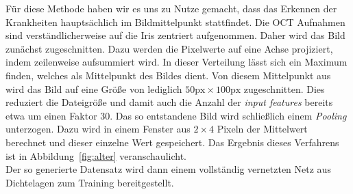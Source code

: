 %
Für diese Methode haben wir es uns zu Nutze gemacht, dass das Erkennen der
Krankheiten hauptsächlich im Bildmittelpunkt stattfindet. Die OCT Aufnahmen
sind verständlicherweise auf die Iris zentriert aufgenommen.
Daher wird das Bild zunächst zugeschnitten. Dazu werden die Pixelwerte auf eine
Achse projiziert, indem zeilenweise aufsummiert wird. In dieser Verteilung
lässt sich ein Maximum finden, welches als Mittelpunkt des Bildes dient.
Von diesem Mittelpunkt aus wird das Bild auf eine Größe von lediglich
$50\text{px}\times100\text{px}$ zugeschnitten. Dies reduziert die Dateigröße
und damit auch die Anzahl der \textit{input features} bereits etwa um einen
Faktor $30$.
Das so entstandene Bild wird schließlich einem \textit{Pooling} unterzogen.
Dazu wird in einem Fenster aus $2\times4$ Pixeln der Mittelwert berechnet und
dieser einzelne Wert gespeichert. Das Ergebnis dieses Verfahrens ist in
Abbildung~\ref{fig:alter} veranschaulicht. \\
Der so generierte Datensatz wird dann einem vollständig vernetzten Netz aus
Dichtelagen zum Training bereitgestellt. \\
%
